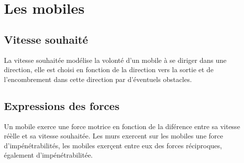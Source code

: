 \section{Les mobiles}
%
\label{samuel1}
\subsection{Vitesse souhaité}
La vitesse souhaitée modélise la volonté d'un mobile à se diriger dans une direction, elle est choisi en fonction de la direction vers la sortie et de l'encombrement dans cette direction par d'éventuels obstacles.\cite{lemercier}
%
\subsection{Expressions des forces}
Un mobile exerce une force motrice en fonction de la diférence entre sa vitesse réèlle et sa vitesse souhaitée. Les murs exercent sur les mobiles une force d'impénétrabilités, les mobiles exerçent entre eux des forces réciproques, également d'impénétrabilitée.

